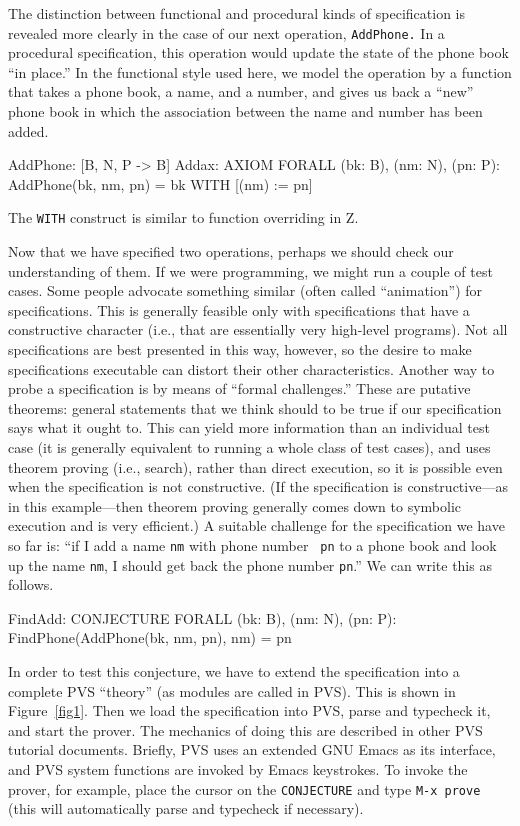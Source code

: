 The distinction between functional and procedural kinds of
specification is revealed more clearly in the case of our next
operation, {\tt AddPhone.}  In a procedural specification, this operation
would update the state of the phone book ``in place.''  In the
functional style used here, we model the operation by a function that
takes a phone book, a name, and a number, and gives us back a ``new''
phone book in which the association between the name and number has
been added.   
\begin{pvsexample}
AddPhone: [B, N, P -> B]
Addax: AXIOM   FORALL (bk: B), (nm: N), (pn: P): 
   AddPhone(bk, nm, pn) = bk WITH [(nm) := pn]
\end{pvsexample}
The {\tt WITH} construct is similar to function overriding in Z.

Now that we have specified two operations, perhaps we should check our
understanding of them.  If we were programming, we might run a couple
of test cases.  Some people advocate something similar (often called
``animation'') for specifications.  This is generally feasible only
with specifications that have a constructive character (i.e., that are
essentially very high-level programs).  Not all specifications are
best presented in this way, however, so the desire to make
specifications executable can distort their other characteristics.
Another way to probe a specification is by means of ``formal
challenges.''  These are putative theorems: general statements that we
think should to be true if our specification says what it ought to.
This can yield more information than an individual test case (it is
generally equivalent to running a whole class of test cases), and uses
theorem proving (i.e., search), rather than direct execution, so it is
possible even when the specification is not constructive.  (If the
specification is constructive---as in this example---then theorem
proving generally comes down to symbolic execution and is
very efficient.)  A suitable challenge for the specification
we have so far is: ``if I add a name {\tt nm} with phone number {\tt
pn} to a phone book and look up the name {\tt nm}, I should get back
the phone number {\tt pn}.''  We can write this as follows.
\begin{pvsexample}
FindAdd: CONJECTURE  FORALL (bk: B), (nm: N), (pn: P):
  FindPhone(AddPhone(bk, nm, pn), nm) = pn
\end{pvsexample}

In order to test this conjecture, we have to extend the specification into a
complete PVS ``theory'' (as modules are called in PVS).  This is shown
in Figure~\ref{fig1}.  Then we load the specification into PVS, parse
and typecheck it, and start the prover.  The mechanics of doing this
are described in other PVS tutorial documents.  Briefly, PVS uses an
extended GNU Emacs as its interface, and PVS system functions are
invoked by Emacs keystrokes.  To invoke the prover, for example, place
the cursor on the {\tt CONJECTURE} and type {\tt M-x prove} (this will
automatically parse and typecheck if necessary).


